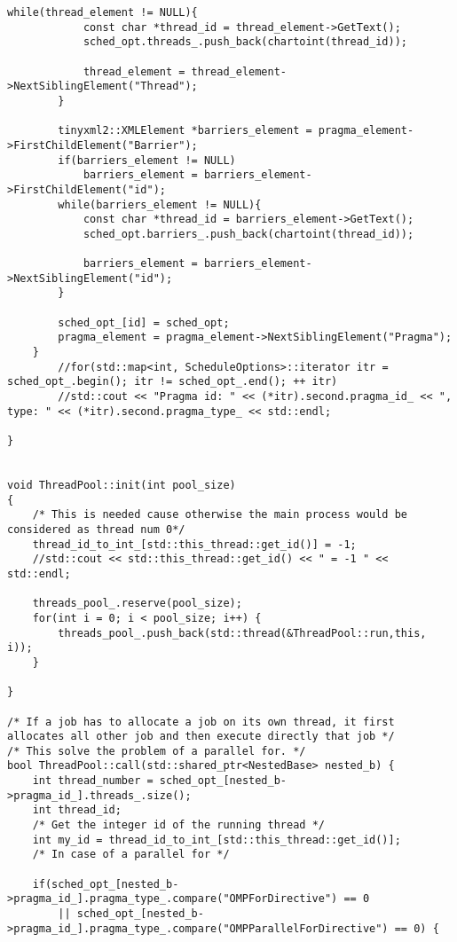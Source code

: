 \documentclass[a4paper,10pt,twoside]{book}
\begin{document}
\begin{lstlisting}[language=CCC, caption=thread\_pool.cpp]
        while(thread_element != NULL){
            const char *thread_id = thread_element->GetText();
            sched_opt.threads_.push_back(chartoint(thread_id));

            thread_element = thread_element->NextSiblingElement("Thread");
        }
        
        tinyxml2::XMLElement *barriers_element = pragma_element->FirstChildElement("Barrier");
        if(barriers_element != NULL)
            barriers_element = barriers_element->FirstChildElement("id");
        while(barriers_element != NULL){
            const char *thread_id = barriers_element->GetText();
            sched_opt.barriers_.push_back(chartoint(thread_id));

            barriers_element = barriers_element->NextSiblingElement("id");
        }

        sched_opt_[id] = sched_opt;
        pragma_element = pragma_element->NextSiblingElement("Pragma");
    }
        //for(std::map<int, ScheduleOptions>::iterator itr = sched_opt_.begin(); itr != sched_opt_.end(); ++ itr)
        //std::cout << "Pragma id: " << (*itr).second.pragma_id_ << ", type: " << (*itr).second.pragma_type_ << std::endl;

}


void ThreadPool::init(int pool_size)
{
    /* This is needed cause otherwise the main process would be considered as thread num 0*/
    thread_id_to_int_[std::this_thread::get_id()] = -1;
    //std::cout << std::this_thread::get_id() << " = -1 " << std::endl;

    threads_pool_.reserve(pool_size);
    for(int i = 0; i < pool_size; i++) {
        threads_pool_.push_back(std::thread(&ThreadPool::run,this, i));
    }

}

/* If a job has to allocate a job on its own thread, it first allocates all other job and then execute directly that job */
/* This solve the problem of a parallel for. */
bool ThreadPool::call(std::shared_ptr<NestedBase> nested_b) {
    int thread_number = sched_opt_[nested_b->pragma_id_].threads_.size();
    int thread_id;
    /* Get the integer id of the running thread */
    int my_id = thread_id_to_int_[std::this_thread::get_id()];
    /* In case of a parallel for */

    if(sched_opt_[nested_b->pragma_id_].pragma_type_.compare("OMPForDirective") == 0
        || sched_opt_[nested_b->pragma_id_].pragma_type_.compare("OMPParallelForDirective") == 0) {
        

\end{lstlisting}
\end{document}
